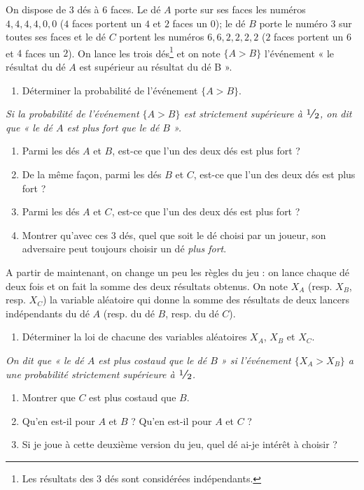 \documentclass[a4paper,12pt,reqno]{amsart}
\begin{document}
\begin{exo}

  On dispose de $3$ dés à $6$ faces. Le dé $A$ porte sur ses faces les numéros $4,4,4,4,0,0$ ($4$ faces portent un $4$ et $2$ faces un $0$); le dé $B$ porte le numéro $3$ sur toutes ses faces et le dé $C$ portent les numéros $6,6,2,2,2,2$ ($2$ faces portent un $6$ et $4$ faces un $2$). On lance les trois dés\footnote{Les résultats des $3$ dés sont considérées indépendants.} et on note $\{A>B\}$ l'événement « le résultat du dé $A$ est supérieur au résultat du dé B ».
  \begin{enumerate}
    \item Déterminer la probabilité de l'événement $\{A>B\}$.
  \end{enumerate}
  \emph{Si la probabilité de l'événement  $\{A>B\}$ est strictement supérieure à $\dsfrac{1}{2}$, on dit que « le dé $A$ est plus fort que le dé $B$ ».}
  \begin{enumerate}[resume]
    \item Parmi les dés $A$ et $B$, est-ce que l'un des deux dés est plus fort ?
    \item De la même façon, parmi les dés $B$ et $C$, est-ce que l'un des deux dés est plus fort ?
    \item Parmi les dés $A$ et $C$, est-ce que l'un des deux dés est plus fort ?
    \item Montrer qu'avec ces $3$ dés, quel que soit le dé choisi par un joueur, son adversaire peut toujours choisir un dé \emph{plus fort}.
  \end{enumerate}\smallskip
  A partir de maintenant, on change un peu les règles du jeu : on lance chaque dé deux fois et on fait la somme des deux résultats obtenus.
  On note $X_A$ (resp. $X_B$, resp. $X_C$) la variable aléatoire qui donne la somme des résultats de deux lancers indépendants du dé $A$ (resp. du dé $B$, resp. du dé $C$).
  \begin{enumerate}[resume]
    \item Déterminer la loi  de chacune des variables aléatoires $X_A$, $X_B$ et $X_C$.
  \end{enumerate}
  \emph{On dit que « le dé $A$ est plus costaud que le dé $B$ » si l'événement $\{X_A >X_B\}$ a une probabilité strictement supérieure à $\dsfrac{1}{2}$.}
  \begin{enumerate}[resume]
    \item Montrer que $C$ est plus costaud que $B.$
    \item Qu'en est-il pour $A$ et $B$ ? Qu'en est-il pour $A$ et $C$ ?
    \item Si je joue à cette deuxième version du jeu, quel dé ai-je intérêt à choisir ? \\
  \end{enumerate}

\end{exo}
\end{document}
